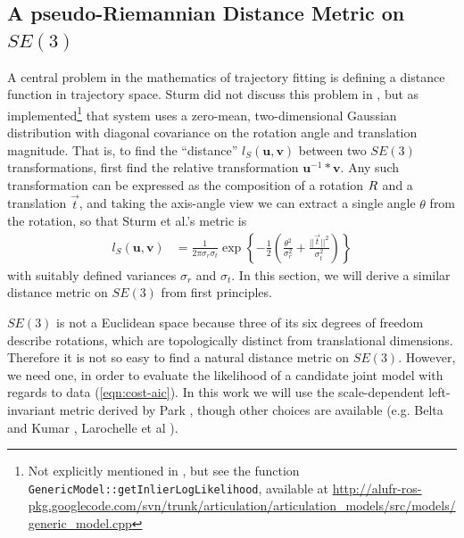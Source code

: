 \documentclass[letterpaper, 10 pt, conference]{ieeeconf}  %
\def\xmat{\uppercase}    \def\xmatstr{in uppercase}
\def\xvec{\vec}          \def\xvecstr{with an arrow}
\def\xse{\bm}            \def\xsestr{in boldface}
\begin{document}
\subsection{A pseudo-Riemannian Distance Metric on $SE(3)$}\label{sec:metric}
A central problem in the mathematics of trajectory fitting is defining a distance function in trajectory space. Sturm did not discuss this problem in \cite{Sturm2011}, but as implemented\footnote{Not explicitly mentioned in \cite{Sturm2011}, but see the function \texttt{GenericModel::getInlierLogLikelihood}, available at \url{http://alufr-ros-pkg.googlecode.com/svn/trunk/articulation/articulation_models/src/models/generic_model.cpp}} that system uses a zero-mean, two-dimensional Gaussian distribution with diagonal covariance on the rotation angle and translation magnitude. That is, to find the ``distance'' $l_S(\xse{u},\xse{v})$ between two $SE(3)$ transformations, first find the relative transformation $\xse{u}^{-1}*\xse{v}$. Any such transformation can be expressed as the composition of a rotation $\xmat{r}$ and a translation $\xvec{t}$, and taking the axis-angle view we can extract a single angle $\theta$ from the rotation, so that Sturm et al.'s metric is
\begin{align}
  l_S(\xse{u},\xse{v}) &= \frac{1}{2\pi \sigma_r \sigma_t} \exp\left\{-\frac{1}{2}\left( \frac{\theta^2}{\sigma_r^2} + \frac{||\xvec{t}||^2}{\sigma_t^2} \right)\right\} \label{eqn:sturm-objective}
\end{align}
with suitably defined variances $\sigma_r$ and $\sigma_t$. In this section, we will derive a similar distance metric on $SE(3)$ from first principles.

$SE(3)$ is not a Euclidean space because three of its six degrees of freedom describe rotations, which are topologically distinct from translational dimensions. Therefore it is not so easy to find a natural distance metric on $SE(3)$. However, we need one, in order to evaluate the likelihood of a candidate joint model with regards to data (\ref{eqn:cost-aic}). In this work we will use the scale-dependent left-invariant metric derived by Park \cite{Park1995}, though other choices are available (e.g. Belta and Kumar \cite{Belta2002}, Larochelle et al \cite{Larochelle2007}).
\end{document}
